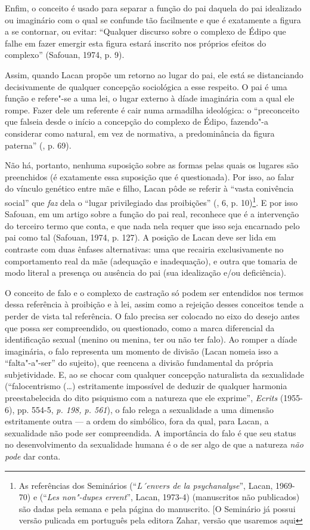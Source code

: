 Enfim, o conceito é usado para separar a função do pai daquela do pai
idealizado ou imaginário com o qual se confunde tão facilmente e que é
exatamente a figura a se contornar, ou evitar: ``Qualquer discurso sobre
o complexo de Édipo que falhe em fazer emergir esta figura estará
inscrito nos próprios efeitos do complexo'' (Safouan, 1974, p. 9).

Assim, quando Lacan propõe um retorno ao lugar do pai, ele está se
distanciando decisivamente de qualquer concepção sociológica a esse
respeito. O pai é uma função e refere"-se a uma lei, o lugar externo à
díade imaginária com a qual ele rompe. Fazer dele um referente é cair
numa armadilha ideológica: o ``preconceito que falseia desde o início a
concepção do complexo de Édipo, fazendo"-a considerar como natural, em
vez de normativa, a predominância da figura paterna'' (, p. 69).

Não há, portanto, nenhuma suposição sobre as formas pelas quais os
lugares são preenchidos (é exatamente essa suposição que é questionada).
Por isso, ao falar do vínculo genético entre mãe e filho, Lacan pôde se
referir à ``vasta conivência social'' que \emph{faz} dela o ``lugar
privilegiado das proibições'' (, 6, p. 10)\footnote{As referências
  dos Seminários  (``\emph{L´envers de la psychanalyse}'', Lacan,
  1969-70) e  (``\emph{Les non"-dupes errent}'', Lacan, 1973-4)
  (manuscritos não publicados) são dadas pela semana e pela página do
  manuscrito. {[}O Seminário  já possui versão pulicada em
  português pela editora Zahar, versão que usaremos aqui \versal{N.~T.}{]}}. E por
isso Safouan, em um artigo sobre a função do pai real, reconhece que é a
intervenção do terceiro termo que conta, e que nada nela requer que isso
seja encarnado pelo pai como tal (Safouan, 1974, p. 127). A posição de
Lacan deve ser lida em contraste com duas ênfases alternativas: uma que
recairia exclusivamente no comportamento real da mãe (adequação e
inadequação), e outra que tomaria de modo literal a presença ou ausência
do pai (sua idealização e/ou deficiência).

O conceito de falo e o complexo de castração só podem ser entendidos nos
termos dessa referência à proibição e à lei, assim como a rejeição
desses conceitos tende a perder de vista tal referência. O falo precisa
ser colocado no eixo do desejo antes que possa ser compreendido, ou
questionado, como a marca diferencial da identificação sexual (menino ou
menina, ter ou não ter falo). Ao romper a díade imaginária, o falo
representa um momento de divisão (Lacan nomeia isso a ``falta"-a"-ser'' do
sujeito), que reencena a divisão fundamental da própria subjetividade.
E, ao se chocar com qualquer concepção naturalista da sexualidade
(``falocentrismo (\ldots{}) estritamente impossível de deduzir de qualquer
harmonia preestabelecida do dito psiquismo com a natureza que ele
exprime'', \emph{Ecrits} (1955-6), pp. 554-5, \emph{p. 198, p. 561}), o
falo relega a sexualidade a uma dimensão estritamente outra --- a ordem
do simbólico, fora da qual, para Lacan, a sexualidade não pode ser
compreendida. A importância do falo é que seu status no desenvolvimento
da sexualidade humana é o de ser algo de que a natureza \emph{não pode}
dar conta.

